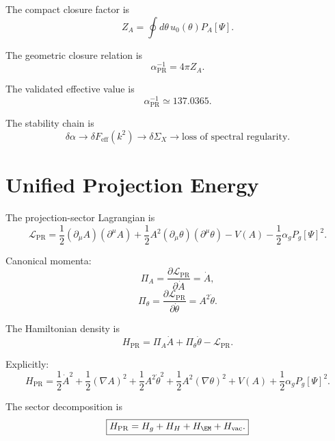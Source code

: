\documentclass[11pt]{article}
\newcommand{\PR}{\mathrm{PR}}
\newcommand{\eff}{\mathrm{eff}}
\newcommand{\vac}{\mathrm{vac}}
\begin{document}
The compact closure factor is
\begin{equation}
Z_A
=
\oint d\theta\,u_0(\theta)P_A[\Psi].
\end{equation}

The geometric closure relation is
\begin{equation}
\boxed{
\alpha_{\PR}^{-1}=4\pi Z_A.
}
\end{equation}

The validated effective value is
\begin{equation}
\boxed{
\alpha_{\PR}^{-1}\simeq137.0365.
}
\end{equation}

The stability chain is
\begin{equation}
\delta\alpha
\rightarrow
\delta F_{\eff}(k^2)
\rightarrow
\delta\Sigma_X
\rightarrow
\text{loss of spectral regularity}.
\end{equation}


\section{Unified Projection Energy}

The projection-sector Lagrangian is
\begin{equation}
\mathcal L_{\PR}
=
\frac12(\partial_\mu A)(\partial^\mu A)
+
\frac12A^2(\partial_\mu\theta)(\partial^\mu\theta)
-
V(A)
-
\frac12\alpha_gP_g[\Psi]^2.
\end{equation}

Canonical momenta:
\begin{equation}
\Pi_A=\frac{\partial\mathcal L_{\PR}}{\partial\dot A}=\dot A,
\end{equation}
\begin{equation}
\Pi_\theta=\frac{\partial\mathcal L_{\PR}}{\partial\dot\theta}=A^2\dot\theta.
\end{equation}

The Hamiltonian density is
\begin{equation}
H_{\PR}
=
\Pi_A\dot A+\Pi_\theta\dot\theta-\mathcal L_{\PR}.
\end{equation}

Explicitly:
\begin{equation}
\boxed{
H_{\PR}
=
\frac12\dot A^2
+
\frac12(\nabla A)^2
+
\frac12A^2\dot\theta^2
+
\frac12A^2(\nabla\theta)^2
+
V(A)
+
\frac12\alpha_gP_g[\Psi]^2.
}
\end{equation}

The sector decomposition is
\begin{equation}
\boxed{
H_{\PR}=H_g+H_H+H_{\EM}+H_{\vac}.
}
\end{equation}
\end{document}
